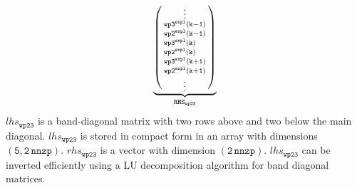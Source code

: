 \documentclass[11pt,fleqn]{article}
\begin{document}
\begin{equation}
\begin{split}
\underbrace{
\left( \begin{smallmatrix}
  \hfill \vdots \hfill \\
  \mathtt{ wp3^{expl}(k-1) } \\
  \mathtt{ wp2^{expl}(k-1) } \\
  \mathtt{ wp3^{expl}(k)\phantom{+0} } \\
  \mathtt{ wp2^{expl}(k)\phantom{+0} } \\
  \mathtt{ wp3^{expl}(k+1) } \\
  \mathtt{ wp2^{expl}(k+1) } \\
  \hfill \vdots \hfill
\end{smallmatrix} \right) }_{ \mathtt{RHS}_{\mathtt{wp23}}}
\end{split}
\end{equation}
%
$lhs_{\mathtt{wp23}}$ is a band-diagonal matrix with two rows above and two below 
the main diagonal. $lhs_{\mathtt{wp23}}$ is stored in compact form in an array 
with dimensions $\mathtt{(5,2\,nnzp)}$. $rhs_{\mathtt{wp23}}$ is a vector 
with dimension $\mathtt{(2\,nnzp)}$. $lhs_{\mathtt{wp23}}$ can be inverted 
efficiently using a LU decomposition algorithm for band diagonal matrices.
\end{document}
